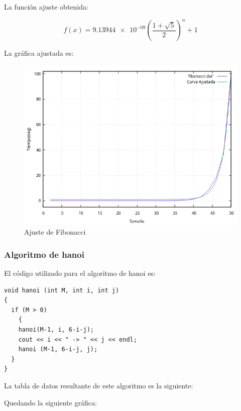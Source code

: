 \documentclass[12pt, spanish]{article}
\begin{document}
La función ajuste obtenida:

\[f(x)=\num{9.13944e-09}\left(\frac{1+\sqrt{5}}{2}\right)^n + 1\]

\newpage

La gráfica ajustada es:

\begin{figure}[H]
  \centering
  \includegraphics[scale = 0.9]{AjusteFibonacci.png}
  \caption{Ajuste de Fibonacci}
\end{figure}

\subsubsection{Algoritmo de hanoi}

El código utilizado para el algoritmo de hanoi es:
\begin{verbatim}
void hanoi (int M, int i, int j)
{
  if (M > 0)
	{
  	hanoi(M-1, i, 6-i-j);
  	cout << i << " -> " << j << endl;
  	hanoi (M-1, 6-i-j, j);
  }
}
\end{verbatim}

\newpage

La tabla de datos resultante de este algoritmo es la siguiente:



\newpage

Quedando la siguiente gráfica:
\end{document}

